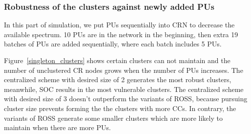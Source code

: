 \documentclass[10pt,journal,compsoc]{IEEEtran}
\theoremstyle{mytheoremstyle}
\theoremstyle{mytheoremstyle}
\theoremstyle{mytheoremstyle}
\newcommand{\ie}{i.e., }
\begin{document}
\subsubsection{Robustness of the clusters against newly added PUs}
In this part of simulation, we put PUs sequentially into CRN to decrease the available spectrum.
10 PUs are in the network in the beginning, then extra 19 batches of PUs are added sequentially, where each batch includes 5 PUs. 

Figure~\ref{singleton_clusters} shows certain clusters can not maintain and the number of unclustered CR nodes grows when the number of PUs increases.
The centralized scheme with desired size of 2 generates the most robust clusters, meanwhile, SOC results in the most vulnerable clusters.
The centralized scheme with desired size of 3 doesn't outperform the variants of ROSS, because pursuing cluster size prevents forming the the clusters with more CCs.
In contrary, the variants of ROSS generate some smaller clusters which are more likely to maintain when there are more PUs.

\end{document}
